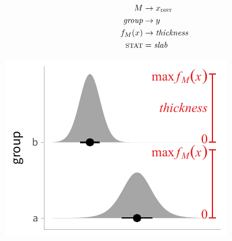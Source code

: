 \documentclass[journal]{vgtc}                     %
\begin{document}
\noindent
\begin{minipage}{.5\columnwidth}

\begin{align*}
M &\rightarrow x_\textsc{dist}\\
\textit{group} &\rightarrow y\\
f_M(x) &\rightarrow \textit{thickness}\\
\textsc{stat} &= \mathit{slab}
\end{align*}
\end{minipage}%
  \begin{minipage}{.4\columnwidth}
    \centering
    \includegraphics[width=1.2\columnwidth]{figs/3-slab_density_two_groups.pdf}
  \end{minipage}
\hfill\break
\end{document}
